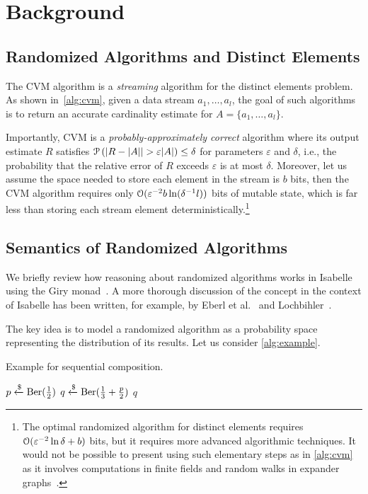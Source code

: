 \section{Background}
\label{sec:background}

\subsection{Randomized Algorithms and Distinct Elements}

The CVM algorithm is a \emph{streaming} algorithm for the distinct elements problem.
As shown in~\cref{alg:cvm}, given a data stream $a_1,\dots, a_l$, the goal of such algorithms is to return an accurate cardinality estimate for $A = \{a_1,\dots,a_l\}$.

Importantly, CVM is a \emph{probably-approximately correct} algorithm where its output estimate $R$ satisfies
$\operatorname{\mathcal P} \left( |R - |A| | > \varepsilon |A| \right) \leq \delta$
for parameters $\varepsilon$ and $\delta$,
i.e., the probability that the relative error of $R$ exceeds $\varepsilon$ is at most $\delta$. %
Moreover, let us assume the space needed to store each element in the stream is $b$ bits, then the CVM algorithm requires only $\operatorname{\mathcal O}(\varepsilon^{-2} b \ln(\delta^{-1} l))$ bits of mutable state, which is far less than storing each stream element deterministically.\footnote{The optimal randomized algorithm for distinct elements requires $\operatorname{\mathcal O}( \varepsilon^{-2} \ln \delta + b)$ bits, but it requires more advanced algorithmic techniques. It would not be possible to present using such elementary steps as in \cref{alg:cvm} as it involves computations in finite fields and random walks in expander graphs~\cite{blasiok2020, karayel2023}.}

\subsection{Semantics of Randomized Algorithms}
We briefly review how reasoning about randomized algorithms works in Isabelle using the Giry monad~\cite{giry1982}.
A more thorough discussion of the concept in the context of Isabelle has been written, for example, by Eberl et al.~\cite{eberl2020} and Lochbihler~\cite{lochbihler2016}.

The key idea is to model a randomized algorithm as a probability space representing the distribution of its results.
Let us consider \cref{alg:example}.
\begin{algorithm}[h!]
\caption{Example for sequential composition.}\label{alg:example}
\begin{algorithmic}[1]
\State $p \xleftarrow{\$} \operatorname{\mathrm{Ber}}(\frac{1}{2})$
\State $q \xleftarrow{\$} \operatorname{\mathrm{Ber}}(\frac{1}{3}+\frac{p}{2})$
\State \Return $q$
\end{algorithmic}
\end{algorithm}%

